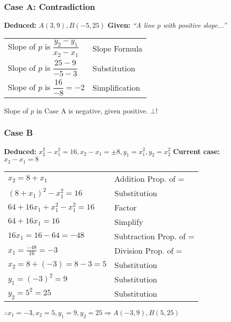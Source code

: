 \documentclass[mathserif]{beamer}
\begin{document}
\begin{frame}
\frametitle{Case A: Contradiction}

\textbf{Deduced: } $A(3,9),B(-5,25)$\newline
\textbf{Given: } \textit{``A line $p$ with positive slope...''}

\begin{center}
	\begin{tabular}{l | l}
		Slope of $p$ is $\dfrac{y_2-y_1}{x_2-x_1}$ & Slope Formula \\
		Slope of $p$ is $\dfrac{25-9}{-5-3}$ & Substitution \\
		Slope of $p$ is $\dfrac{16}{-8}=-2$ & Simplification
		\end{tabular}
	
\end{center}

Slope of $p$ in Case A is negative, given positive. $\bot$!

\end{frame}
\begin{frame}
\frametitle{Case B}

	\textbf{Deduced:} $x_2^2-x_1^2=16, x_2-x_1=\pm 8, y_1=x_1^2, y_2=x_2^2$\newline
\textbf{Current case:} $x_2-x_1=8$

\begin{center}
	\begin{tabular}{l | l}
		$x_2=8+x_1$ & Addition Prop. of = \\
		$(8+x_1)^2-x_1^2=16$ & Substitution \\
		$64+16x_1+x_1^2-x_1^2=16$ & Factor \\
		$64+16x_1=16$ & Simplify \\
		$16x_1=16-64=-48$ & Subtraction Prop. of = \\
		$x_1=\frac{-48}{16}=-3$ & Division Prop. of = \\
		$x_2=8+(-3)=8-3=5$ & Substitution \\
		$y_1=(-3)^2=9$ & Substitution \\
		$y_2=5^2=25$ & Substitution
	\end{tabular}

\end{center}

$\therefore x_1=-3,x_2=5,y_1=9,y_2=25 \Rightarrow A(-3,9), B(5,25)$
\end{frame}
\end{document}
